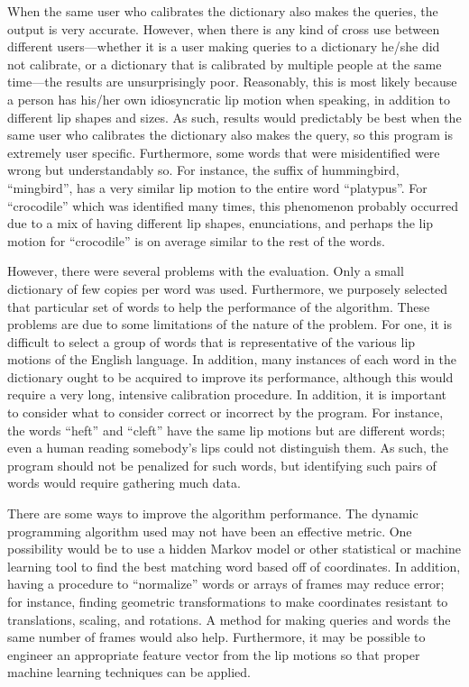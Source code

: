 \documentclass[10pt,twocolumn,letterpaper]{article}
\begin{document}
When the same user who calibrates the dictionary also makes the queries, the output is very accurate. However, when there is any kind of cross use between different users—whether it is a user making queries to a dictionary he/she did not calibrate, or a dictionary that is calibrated by multiple people at the same time—the results are unsurprisingly poor. Reasonably, this is most likely because a person has his/her own idiosyncratic lip motion when speaking, in addition to different lip shapes and sizes. As such, results would predictably be best when the same user who calibrates the dictionary also makes the query, so this program is extremely user specific. Furthermore, some words that were misidentified were wrong but understandably so. For instance, the suffix of hummingbird, “mingbird”, has a very similar lip motion to the entire word “platypus”. For “crocodile” which was identified many times, this phenomenon probably occurred due to a mix of having different lip shapes, enunciations, and perhaps the lip motion for “crocodile” is on average similar to the rest of the words.

However, there were several problems with the evaluation. Only a small dictionary of few copies per word was used. Furthermore, we purposely selected that particular set of words to help the performance of the algorithm. These problems are due to some limitations of the nature of the problem. For one, it is difficult to select a group of words that is representative of the various lip motions of the English language. In addition, many instances of each word in the dictionary ought to be acquired to improve its performance, although this would require a very long, intensive calibration procedure. In addition, it is important to consider what to consider correct or incorrect by the program. For instance, the words “heft” and “cleft” have the same lip motions but are different words; even a human reading somebody’s lips could not distinguish them. As such, the program should not be penalized for such words, but identifying such pairs of words would require gathering much data.

There are some ways to improve the algorithm performance. The dynamic programming algorithm used may not have been an effective metric. One possibility would be to use a hidden Markov model or other statistical or machine learning tool to find the best matching word based off of coordinates. In addition, having a procedure to “normalize” words or arrays of frames may reduce error; for instance, finding geometric transformations to make coordinates resistant to translations, scaling, and rotations. A method for making queries and words the same number of frames would also help. Furthermore, it may be possible to engineer an appropriate feature vector from the lip motions so that proper machine learning techniques can be applied.
\end{document}
